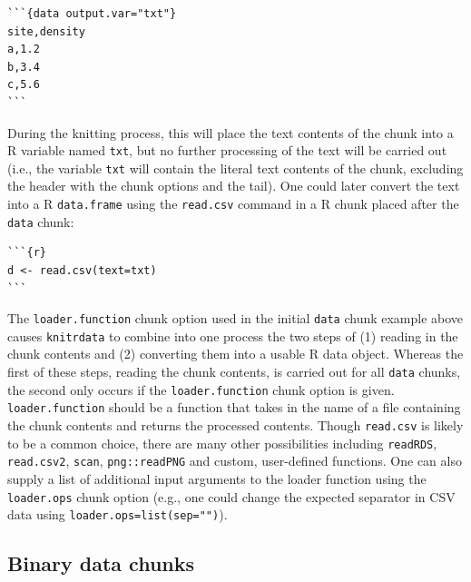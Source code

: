 \begin{verbatim}
```{data output.var="txt"}
site,density
a,1.2
b,3.4
c,5.6
```
\end{verbatim}

During the knitting process, this will place the text contents of the chunk into a R variable named \texttt{txt}, but no further processing of the text will be carried out (i.e., the variable \texttt{txt} will contain the literal text contents of the chunk, excluding the header with the chunk options and the tail). One could later convert the text into a R \texttt{data.frame} using the \texttt{read.csv} command in a R chunk placed after the \texttt{data} chunk:

\begin{verbatim}
```{r}
d <- read.csv(text=txt)
```
\end{verbatim}

The \texttt{loader.function} chunk option used in the initial \texttt{data} chunk example above causes \texttt{knitrdata} to combine into one process the two steps of (1) reading in the chunk contents and (2) converting them into a usable R data object. Whereas the first of these steps, reading the chunk contents, is carried out for all \texttt{data} chunks, the second only occurs if the \texttt{loader.function} chunk option is given. \texttt{loader.function} should be a function that takes in the name of a file containing the chunk contents and returns the processed contents. Though \texttt{read.csv} is likely to be a common choice, there are many other possibilities including \texttt{readRDS}, \texttt{read.csv2}, \texttt{scan}, \texttt{png::readPNG} and custom, user-defined functions. One can also supply a list of additional input arguments to the loader function using the \texttt{loader.ops} chunk option (e.g., one could change the expected separator in CSV data using \texttt{loader.ops=list(sep="\textbar{}")}).

\hypertarget{binary}{%
\subsection{Binary data chunks}\label{binary}}

